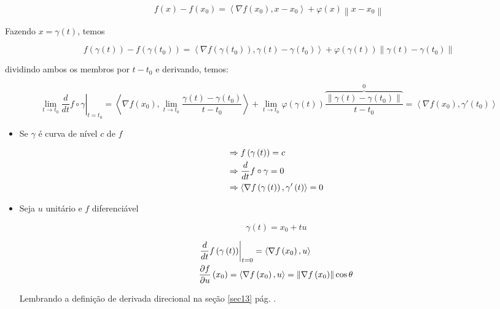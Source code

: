 \documentclass{book}
\begin{document}
\begin{dem}
\[
f\left( x \right) - f\left( {x_0 } \right) = \left\langle {\nabla f\left( {x_0 } \right),x - x_0 } \right\rangle  + \varphi \left( x \right)\left\| {x - x_0 } \right\|
\]

Fazendo $x = \gamma \left( t \right)$, temos

\[
f\left( {\gamma \left( t \right)} \right) - f\left( {\gamma \left( {t_0 } \right)} \right) = \left\langle {\nabla f\left( {\gamma \left( {t_0 } \right)} \right),\gamma \left( t \right) - \gamma \left( {t_0 } \right)} \right\rangle  + \varphi \left( {\gamma \left( {t} \right)} \right)\left\| {\gamma \left( t \right) - \gamma \left( {t_0 } \right)} \right\|
\]

dividindo ambos os membros por $t - t_0$ e derivando, temos:

\[
\scriptstyle{
\left. {\mathop {\lim }\limits_{t \to t_0 } \frac{d}
{{dt}}f \circ \gamma } \right|_{t = t_0 }  = \left\langle {\nabla f\left( {x_0 } \right),\mathop {\lim }\limits_{t \to t_0 } \frac{{\gamma \left( t \right) - \gamma \left( {t_0 } \right)}}
{{t - t_0 }}} \right\rangle  + \mathop {\lim }\limits_{t \to t_0 } \varphi \left( {\gamma \left( t \right)} \right)\overbrace {\frac{{\left\| {\gamma \left( t \right) - \gamma \left( {t_0 } \right)} \right\|}}
{{t - t_0 }}}^0 = \left\langle {\nabla f\left( {x_0 } \right),\gamma '\left( {t_0 } \right)} \right\rangle
}
\]

\end{dem}

\begin{itemize}
\item Se $\gamma$ \'e curva de n\'ivel $c$ de $f$

\[
\begin{gathered}
\Rightarrow f\left( {\gamma \left( t \right)} \right) = c \hfill \\
\Rightarrow \frac{d}
{{dt}}f \circ \gamma  = 0 \hfill \\
   \Rightarrow \left\langle {\nabla f\left( {\gamma \left( t \right)} \right),\gamma '\left( t \right)} \right\rangle  = 0 \hfill \\
\end{gathered}
\]

\item Seja $u$ unit\'ario e $f$ diferenci\'avel

\[
\gamma \left( t \right) = x_0  + tu
\]

\[
\begin{gathered}
\left. {\frac{d}
{{dt}}f\left( {\gamma \left( t \right)} \right)} \right|_{t = 0}  = \left\langle {\nabla f\left( {x_0 } \right),u} \right\rangle  \hfill \\
\frac{{\partial f}}
{{\partial u}}\left( {x_0 } \right) = \left\langle {\nabla f\left( {x_0 } \right),u} \right\rangle  = \left\| {\nabla f\left( {x_0 } \right)} \right\|\cos \theta  \hfill \\
\end{gathered}
\]

    Lembrando a defini\c c\~ao de derivada direcional na se\c c\~ao \ref{sec13} p\'ag. \pageref{sec13}.

\end{itemize}
\end{document}
